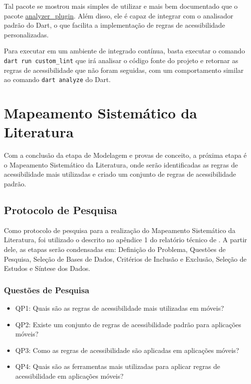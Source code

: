 Tal pacote se mostrou mais simples de utilizar e mais bem documentado que o pacote \href{https://pub.dev/packages/analyzer_plugin}{analyzer\_plugin}. Além disso, ele é capaz de integrar com o analisador padrão do Dart, o que facilita a implementação de regras de acessibilidade personalizadas. 

Para executar em um ambiente de integrado contínua, basta executar o comando \texttt{dart run custom\_lint} que irá analisar o código fonte do projeto e retornar as regras de acessibilidade que não foram seguidas, com um comportamento similar ao comando \texttt{dart analyze} do Dart.

\section{Mapeamento Sistemático da Literatura}

Com a conclusão da etapa de Modelagem e provas de conceito, a próxima etapa é o Mapeamento Sistemático da Literatura, onde serão identificadas as regras de acessibilidade mais utilizadas e criado um conjunto de regras de acessibilidade padrão.

\subsection{Protocolo de Pesquisa}

Como protocolo de pesquisa para a realização do Mapeamento Sistemático da Literatura, foi utilizado o descrito no apêndice 1 do relatório técnico de \cite{srufrj}. A partir dele, as etapas serão condensadas em: Definição do Problema, Questões de Pesquisa, Seleção de Bases de Dados, Critérios de Inclusão e Exclusão, Seleção de Estudos e Síntese dos Dados.

\subsubsection{Questões de Pesquisa}

\begin{itemize}
	\item QP1: Quais são as regras de acessibilidade mais utilizadas em móveis?
	\item QP2: Existe um conjunto de regras de acessibilidade padrão para aplicações móveis?
	\item QP3: Como as regras de acessibilidade são aplicadas em aplicações móveis?
	\item QP4: Quais são as ferramentas mais utilizadas para aplicar regras de acessibilidade em aplicações móveis?
\end{itemize}

